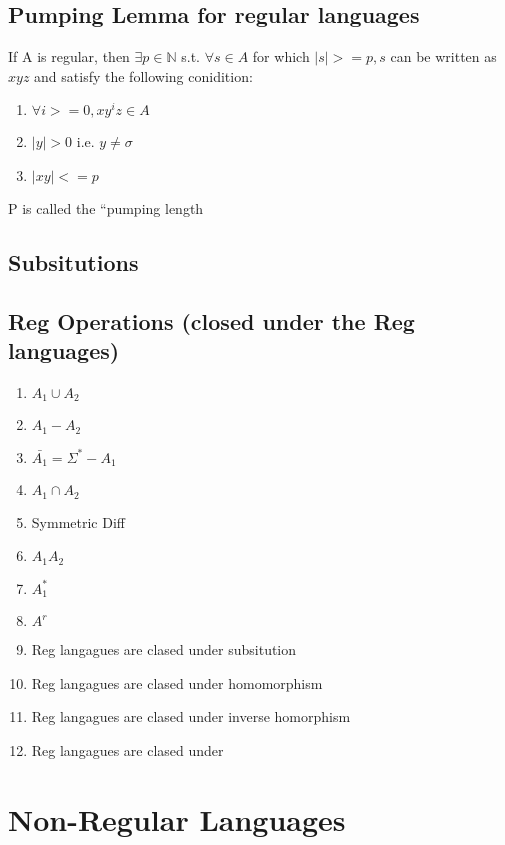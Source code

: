 \documentclass[11pt]{article}
\begin{document}
\subsection{Pumping Lemma for regular languages}
\label{sec-2.5}

  If A is regular, then $\exists p \in \mathbb{N}$ s.t. $\forall s
   \in A$ for which $|s| >= p, s$ can be written as  $xyz$ and
   satisfy the following conidition:
\begin{enumerate}
\item $\forall i >= 0, x y^i z \in A$
\item $|y|>0$ i.e. $y \neq \sigma$
\item $|xy| <= p$
\end{enumerate}
  P is called the ``pumping length

\subsection{Subsitutions}
\label{sec-2.6}

\subsection{Reg Operations (closed under the Reg languages)}
\label{sec-2.7}

\begin{enumerate}
\item $A_1 \cup A_2$
\item $A_1 - A_2$
\item $\bar{A_1} = \Sigma^* - A_1$
\item $A_1 \cap A_2$
\item Symmetric Diff
\item $A_1 A_2$
\item $A_1^*$
\item $A^r$
\item Reg langagues are clased under subsitution
\item Reg langagues are clased under homomorphism
\item Reg langagues are clased under inverse homorphism
\item Reg langagues are clased under
\end{enumerate}
\section{Non-Regular Languages}
\label{sec-3}
\end{document}
